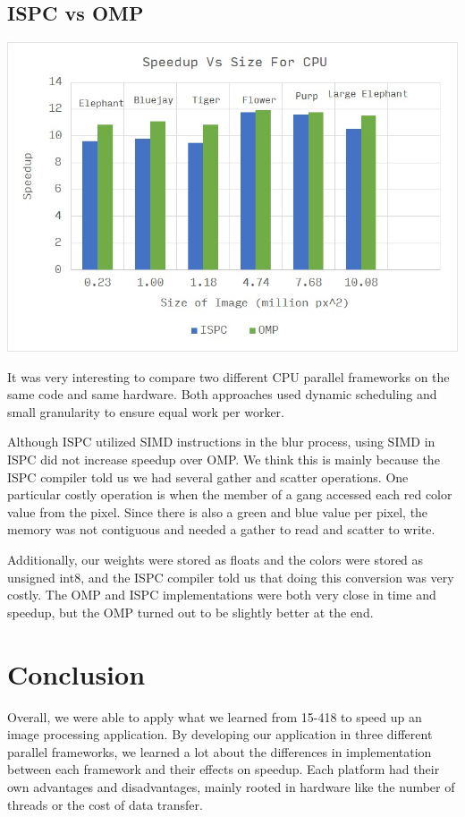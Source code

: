 \documentclass[12pt]{article}
\begin{document}
\subsection{ISPC vs OMP}
\begin{center}
\includegraphics[scale=0.8]{cpu.jpg}
\end{center}

It was very interesting to compare two different CPU parallel frameworks on the
same code and same hardware. Both approaches used dynamic scheduling and small
granularity to ensure equal work per worker.

Although ISPC utilized SIMD instructions in the blur process, using SIMD in
ISPC did not increase speedup over OMP. We think this is mainly because the
ISPC compiler told us we had several gather and scatter operations. One
particular costly operation is when the member of a gang accessed each red
color value from the pixel. Since there is also a green and blue value per
pixel, the memory was not contiguous and needed a gather to read and scatter to
write.

Additionally, our weights were stored as floats and the colors were stored as
unsigned int8, and the ISPC compiler told us that doing this conversion was
very costly. The OMP and ISPC implementations were both very close in time and
speedup, but the OMP turned out to be slightly better at the end.

\section{Conclusion}

Overall, we were able to apply what we learned from 15-418 to speed up an image
processing application. By developing our application in three different
parallel frameworks, we learned a lot about the differences in implementation
between each framework and their effects on speedup. Each platform had their
own advantages and disadvantages, mainly rooted in hardware like the number of
threads or the cost of data transfer.
\end{document}
